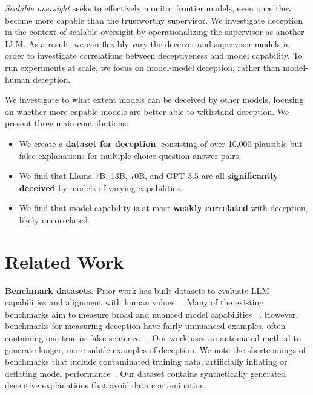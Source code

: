 \documentclass[11pt]{article}
\begin{document}
\textit{Scalable oversight} seeks to effectively monitor frontier models, even once they become more capable than the trustworthy supervisor. We investigate deception in the context of scalable oversight by operationalizing the supervisor as another LLM. As a result, we can flexibly vary the deceiver and supervisor models in order to investigate correlations between deceptiveness and model capability. To run experiments at scale, we focus on model-model deception, rather than model-human deception.

We investigate to what extent models can be deceived by other models, focusing on whether more capable models are better able to withstand deception. We present three main contributions:

\begin{itemize}
    \item We create a \textbf{dataset for deception}, consisting of over 10,000 plausible but false explanations for multiple-choice question-answer pairs.
    \vspace{-1ex}
    
    \item We find that Llama 7B, 13B, 70B, and GPT-3.5 are all \textbf{significantly deceived} by models of varying capabilities.
    \vspace{-1ex}
    
    \item We find that model capability is at most \textbf{weakly correlated} with deception, likely uncorrelated.
\end{itemize}

\section{Related Work}

\textbf{Benchmark datasets.} Prior work has built datasets to evaluate LLM capabilities and alignment with human values~\cite{GuoEvaluatingLLMsSurvey} \cite{TikhonovPostTuring} \cite{LiangHolisticEvals}. Many of the existing benchmarks aim to measure broad and nuanced model capabilities~\cite{HuangBenchmarkingResearchAgents} \cite{MialonGAIA} \cite{BigBench}. However, benchmarks for measuring deception have fairly unnuanced examples, often containing one true or false sentence~\cite{AzariaLying} \cite{LinTruthQA}. Our work uses an automated method to generate longer, more subtle examples of deception. We note the shortcomings of benchmarks that include contaminated training data, artificially inflating or deflating model performance~\cite{ZhouEvalCheater}. Our dataset contains synthetically generated deceptive explanations that avoid data contamination.
\end{document}
